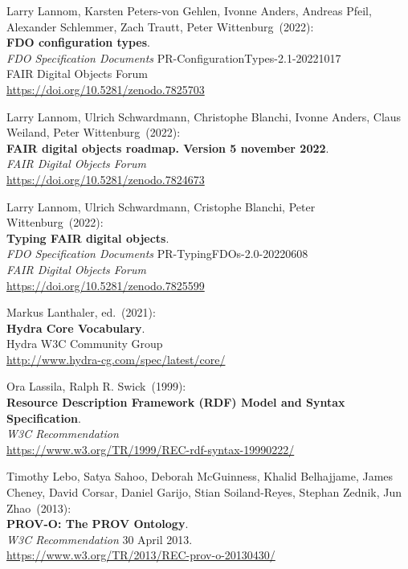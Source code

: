 \begin{thebibliography}{9}
Larry Lannom, Karsten Peters-von Gehlen, Ivonne Anders, Andreas Pfeil, Alexander Schlemmer, Zach Trautt, Peter Wittenburg~(2022): \\
\textbf{{FDO} configuration types}. \\
\emph{FDO Specification Documents} PR-ConfigurationTypes-2.1-20221017 \\
FAIR Digital Objects Forum \\
\url{https://doi.org/10.5281/zenodo.7825703}

Larry Lannom, Ulrich Schwardmann, Christophe Blanchi, Ivonne Anders, Claus Weiland, Peter Wittenburg~(2022): \\
\textbf{FAIR digital objects roadmap. Version 5 november 2022}.\\
\emph{FAIR Digital Objects Forum}\\
\url{https://doi.org/10.5281/zenodo.7824673}

Larry Lannom, Ulrich Schwardmann, Cristophe Blanchi, Peter Wittenburg~(2022): \\
\textbf{Typing {FAIR} digital objects}. \\
\emph{FDO Specification Documents} PR-TypingFDOs-2.0-20220608 \\
\emph{FAIR Digital Objects Forum}\\
\url{https://doi.org/10.5281/zenodo.7825599}

Markus Lanthaler, ed.~(2021): \\
\textbf{Hydra Core Vocabulary}.\\
Hydra W3C Community Group\\
\url{http://www.hydra-cg.com/spec/latest/core/} 

Ora Lassila, Ralph R. Swick~(1999): \\
\textbf{Resource {Description Framework} ({RDF}) {Model} and {Syntax Specification}}. \\
\emph{W3C Recommendation}\\
\url{https://www.w3.org/TR/1999/REC-rdf-syntax-19990222/}  

Timothy Lebo, Satya Sahoo, Deborah McGuinness, Khalid Belhajjame, James Cheney, David Corsar, Daniel Garijo, Stian Soiland-Reyes,  Stephan Zednik, Jun Zhao~(2013): \\
\textbf{PROV-O: The PROV Ontology}.\\
\emph{W3C Recommendation} 30 April 2013.\\
\url{https://www.w3.org/TR/2013/REC-prov-o-20130430/}


\end{thebibliography}

